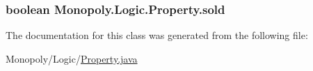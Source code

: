 \subsubsection[{\texorpdfstring{sold}{sold}}]{\setlength{\rightskip}{0pt plus 5cm}boolean Monopoly.\+Logic.\+Property.\+sold\hspace{0.3cm}{\ttfamily [protected]}}\hypertarget{class_monopoly_1_1_logic_1_1_property_a3a3b93ad91c78c5fc0ffd6f5bfbdad1b}{}\label{class_monopoly_1_1_logic_1_1_property_a3a3b93ad91c78c5fc0ffd6f5bfbdad1b}


The documentation for this class was generated from the following file\+:\begin{DoxyCompactItemize}
\item 
Monopoly/\+Logic/\hyperlink{_property_8java}{Property.\+java}\end{DoxyCompactItemize}
